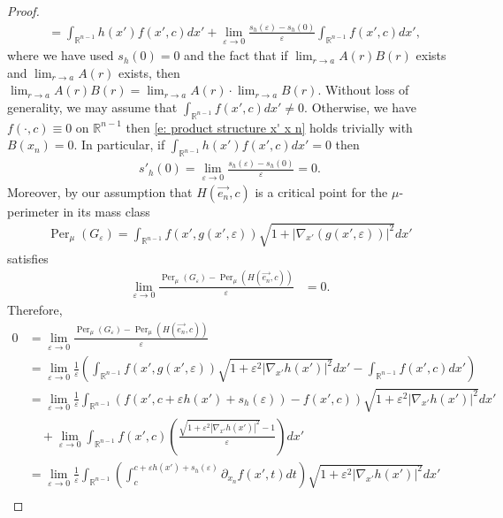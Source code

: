 \documentclass[12pt]{amsart}
\numberwithin{equation}{section}
\theoremstyle{plain}
\theoremstyle{definition}
\begin{document}
\begin{proof}
\begin{align*}
& = \int_{\mathbb{R}^{n-1}} h(x') f(x', c)dx' + \lim_{\varepsilon \rightarrow 0} \frac{s_h(\varepsilon) -s_h(0)}{\varepsilon}\int_{\mathbb{R}^{n-1}}f(x', c)dx',
\end{align*}
where we have used $s_h(0)=0$ and the fact that if $\lim_{r\rightarrow a} A(r)B(r)$ exists and $\lim_{r\rightarrow a} A(r)$ exists, then $\lim_{r\rightarrow a} A(r)B(r) = \lim_{r\rightarrow a} A(r) \cdot \lim_{r\rightarrow a} B(r)$. Without loss of generality, we may assume that $\int_{\mathbb{R}^{n-1}}f(x', c)dx'\not=0$. Otherwise, we have $f(\cdot, c) \equiv 0$ on $\mathbb{R}^{n-1}$ then \eqref{e: product structure x' x n} holds trivially with $B(x_n) = 0$. In particular, if $\int_{\mathbb{R}^{n-1}}h(x')f(x', c)dx'=0$ then 
\begin{align}\label{s_prime}
s'_h(0)=\lim_{\varepsilon \rightarrow 0} \frac{s_h(\varepsilon) -s_h(0)}{\varepsilon}=0.
\end{align}
Moreover, by our assumption that $H(\vec{e_n}, c)$ is a critical point for the $\mu$-perimeter in its mass class
\begin{align}\label{e:minimizer}
    \operatorname{Per}_{\mu}(G_\varepsilon) = \int_{\mathbb{R}^{n-1}}f(x', g(x', \varepsilon))\sqrt{1+ |\nabla_{x'}(g(x', \varepsilon))|^2}dx'
\end{align}
satisfies 
\begin{align}\label{e:first variation}
    \lim_{\varepsilon\to 0}\frac{\operatorname{Per}_{\mu}(G_{\varepsilon})-\operatorname{Per}_{\mu}(H(\vec{e_n}, c))}{\varepsilon} & = 0.    
\end{align}
Therefore, 
\begin{align*}
0&=\lim_{\varepsilon\to 0}\frac{\operatorname{Per}_{\mu}(G_{\varepsilon})-\operatorname{Per}_{\mu}(H(\vec{e_n}, c))}{\varepsilon}\\
&=\lim_{\varepsilon\to 0}\frac{1}{\varepsilon}\left(\int_{\mathbb{R}^{n-1}}f(x', g(x', \varepsilon))\sqrt{1+ \varepsilon^2|\nabla_{x'}h(x')|^2}dx'-\int_{\mathbb{R}^{n-1}}f(x', c)dx'\right)\\
&=\lim_{\varepsilon\to 0}\frac{1}{\varepsilon}\int_{\mathbb{R}^{n-1}}\left(f(x', c+ \varepsilon h(x') + s_h(\varepsilon))-f(x',c)\right)\sqrt{1+ \varepsilon^2|\nabla_{x'}h(x')|^2}dx'\\
&\quad +\lim_{\varepsilon\to 0}\int_{\mathbb{R}^{n-1}}f(x', c)\left(\frac{\sqrt{1+ \varepsilon^2|\nabla_{x'}h(x')|^2}-1}{\varepsilon}\right)dx'\\
&=\lim_{\varepsilon\to 0}\frac{1}{\varepsilon}\int_{\mathbb{R}^{n-1}}\left(\int_c^{c+\varepsilon h(x')+s_h(\varepsilon)}\partial_{x_n}f(x',t)dt\right)\sqrt{1+ \varepsilon^2|\nabla_{x'}h(x')|^2}dx'\\

\end{align*}
\end{proof}
\end{document}
